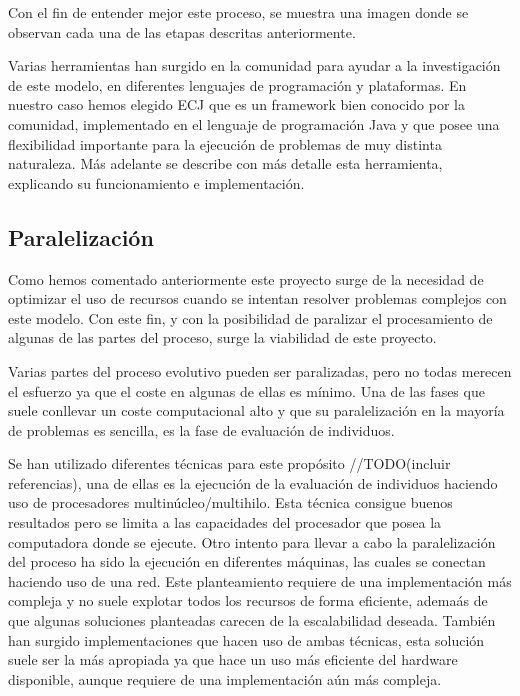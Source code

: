 Con el fin de entender mejor este proceso, se muestra una imagen  donde se observan cada una de las etapas descritas anteriormente.


Varias herramientas han surgido en la comunidad para ayudar a la investigación de este modelo, en diferentes lenguajes de programación y plataformas. En nuestro caso hemos elegido ECJ que es un framework bien conocido por la comunidad, implementado en el lenguaje de programación Java y que posee una flexibilidad importante para la ejecución de problemas de muy distinta naturaleza. M\'as adelante  se describe con m\'as detalle esta herramienta, explicando su funcionamiento e implementación.

\subsection{Paralelizaci\'on\label{analisis-evolutivos-paralelizacion}}

Como hemos comentado anteriormente  este proyecto surge de la necesidad de optimizar el uso de recursos cuando se intentan resolver problemas complejos con este modelo. Con este fin, y con la posibilidad de paralizar el procesamiento de algunas de las partes del proceso, surge la viabilidad de este proyecto.

Varias partes del proceso evolutivo pueden ser paralizadas, pero no todas merecen el esfuerzo ya que el coste en algunas de ellas es mínimo. Una de las fases que suele conllevar un coste computacional alto y que su paralelizaci\'on en la mayoría de problemas es sencilla, es la fase de evaluaci\'on de individuos.

Se han utilizado diferentes técnicas para este prop\'osito //TODO(incluir referencias), una de ellas es la ejecución de la evaluación de individuos haciendo uso de procesadores multin\'ucleo/multihilo. Esta t\'ecnica consigue buenos resultados pero se limita a las capacidades del procesador que posea la computadora donde se ejecute. Otro intento para llevar a cabo la paralelizaci\'on del proceso ha sido la ejecución en diferentes m\'aquinas, las cuales se conectan haciendo uso de una red. Este planteamiento requiere de una implementación m\'as compleja y no suele explotar todos los recursos de forma eficiente, adema\'as de que algunas soluciones planteadas carecen de la escalabilidad deseada. Tambi\'en han surgido implementaciones que hacen uso de ambas t\'ecnicas, esta solución suele ser la m\'as apropiada ya que hace un uso m\'as eficiente del hardware disponible, aunque requiere de una implementación a\'un m\'as compleja.

